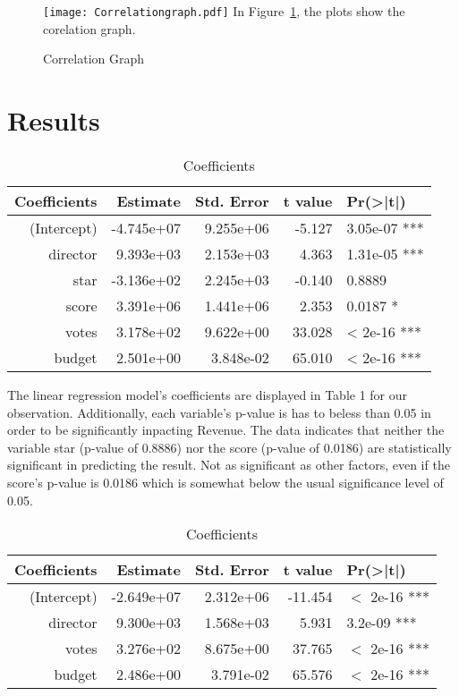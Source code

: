 \documentclass[12pt]{article}
\begin{document}
\begin{figure}
  \centering
	\caption{Correlation Graph}
	\texttt{[image: Correlationgraph.pdf]}
	\label{fig:Correlationgraph}
In Figure~\ref{fig:Correlationgraph}, the plots show the corelation graph.
\end{figure}

\section{Results}
\label{sec:res}

\begin{table}[h]
\centering
\caption{Table 1: Linear Regression Model}
\begin{tabular}{rrrr}
\hline
\textbf{Coefficients} & \textbf{Estimate} & \textbf{Std. Error} & \textbf{t value} & \textbf{Pr(\textgreater|t|)} \\
\hline
(Intercept) & -4.745e+07 & 9.255e+06 & -5.127 & 3.05e-07 *** \\
director & 9.393e+03 & 2.153e+03 & 4.363 & 1.31e-05 *** \\
star & -3.136e+02 & 2.245e+03 & -0.140 & 0.8889 \\
score & 3.391e+06 & 1.441e+06 & 2.353 & 0.0187 * \\
votes & 3.178e+02 & 9.622e+00 & 33.028 & < 2e-16 *** \\
budget & 2.501e+00 & 3.848e-02 & 65.010 & < 2e-16 *** \\
\hline
\end{tabular}
\caption{Coefficients}
\label{tab:coefficients}
\end{table}

The linear regression model's coefficients are displayed in Table 1 for our observation. Additionally, each variable's p-value is has to beless than 0.05 in order to be significantly inpacting Revenue. The data indicates that neither the variable star (p-value of 0.8886) nor the score (p-value of 0.0186) are statistically significant in predicting the result. Not as significant as other factors, even if the score's p-value is 0.0186 which is somewhat below the usual significance level of 0.05.

\begin{table}[h]
\centering
\caption{Table 2: Fitted Linear Regresion Model}
\begin{tabular}{rrrr}
\hline
\textbf{Coefficients} & \textbf{Estimate} & \textbf{Std. Error} & \textbf{t value} & \textbf{Pr(\textgreater|t|)} \\
\hline
(Intercept) & -2.649e+07 & 2.312e+06 & -11.454 & $<$ 2e-16 *** \\
director & 9.300e+03 & 1.568e+03 & 5.931 & 3.2e-09 *** \\
votes & 3.276e+02 & 8.675e+00 & 37.765 & $<$ 2e-16 *** \\
budget & 2.486e+00 & 3.791e-02 & 65.576 & $<$ 2e-16 *** \\
\hline
\end{tabular}
\caption{Coefficients}
\label{tab:coefficients}
\end{table}
\end{document}
